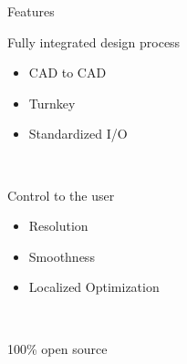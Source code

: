 \begin{frame}{Features}

\begin{block}{Fully integrated design process}{
		\begin{itemize}		
			\item CAD to CAD
			\item Turnkey
			\item Standardized I/O			
		\end{itemize}~\\
		}
		\end{block}
\pause
\begin{block}{Control to the user}{
		\begin{itemize}		
			\item Resolution
			\item Smoothness
			\item Localized Optimization			
		\end{itemize}~\\
		}
		\end{block}
\pause		
\begin{block}{100\% open source}{
		}
		\end{block}

\end{frame}
		